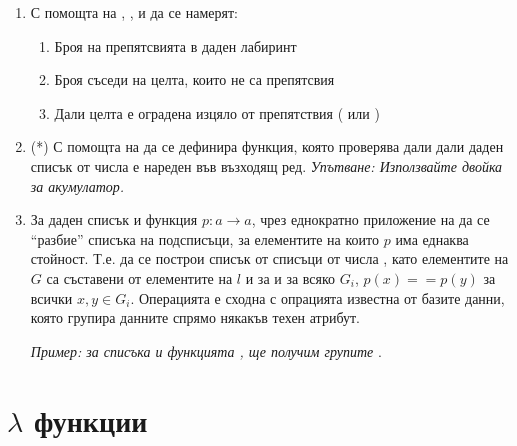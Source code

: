 \begin{enumerate}[resume]
	\item С помощта на , ,  и  да се намерят:
	\begin{enumerate}[label=\alph*)]
		\item Броя на препятсвията в даден лабиринт
		\item Броя съседи на целта, които не са препятсвия
		\item Дали целта е оградена изцяло от препятствия ( или )
	\end{enumerate}

	\item(*) С помощта на  да се дефинира функция, която проверява дали дали даден списък от числа  е нареден във възходящ ред. \emph{Упътване: Използвайте двойка  за акумулатор.}
	
	\item За даден списък  и функция $p:a \rightarrow a$, чрез еднократно приложение на  да се ``разбие'' списъка  на подсписъци, за елементите на които $p$ има еднаква стойност. Т.е. да се
	построи списък от списъци от числа , като елементите на $G$ са съставени от елементите на $l$ и  за и за всяко $G_i$, $p(x)==p(y)$ за всички $x,y \in G_i$. Операцията е сходна с опрацията  известна от базите данни, която групира данните спрямо някакъв техен атрибут.
  
  \emph{Пример: за списъка  и функцията , ще получим групите \code{[[3,6,9],[1,7,10],[2,8]]}}.


\end{enumerate}

\section {$\lambda$ функции}

